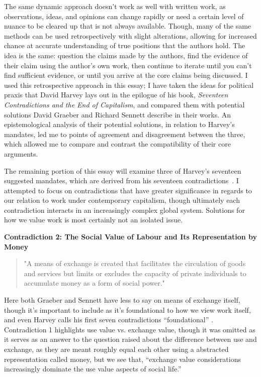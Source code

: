 \documentclass[12pt,a4paper]{article}
\begin{document}
The same dynamic approach doesn’t work as well with written work, as observations, ideas, and opinions can change rapidly or need a certain level of nuance to be cleared up that is not always available. Though, many of the same methods can be used retrospectively with slight alterations, allowing for increased chance at accurate understanding of true positions that the authors hold. The idea is the same: question the claims made by the authors, find the evidence of their claim using the author's own work, then continue to iterate until you can’t find sufficient evidence, or until you arrive at the core claims being discussed. I used this retrospective approach in this essay; I have taken the ideas for political praxis that David Harvey lays out in the epilogue of his book, \textit{Seventeen Contradictions and the End of Capitalism}, and compared them with potential solutions David Graeber and Richard Sennett describe in their works. An epistemological analysis of their potential solutions, in relation to Harvey’s mandates, led me to points of agreement and disagreement between the three, which allowed me to compare and contrast the compatibility of their core arguments. 
\vspace*{10pt}

The remaining portion of this essay will examine three of Harvey's seventeen suggested mandates, which are derived from his seventeen contradictions~\cite{con}. I attempted to focus on contradictions that have greater significance in regards to our relation to work under contemporary capitalism, though ultimately each contradiction interacts in an increasingly complex global system. Solutions for how we value work is most certainly not an isolated issue.

\textbf{Contradiction 2: The Social Value of Labour and Its Representation
by Money}
\begin{quotation} {\color{G-Moon}
    \noindent "A means of exchange is created that facilitates the circulation of goods and services but limits or excludes the capacity of private individuals to accumulate money as a form of social power." \cite{con}}
\end{quotation}
Here both Graeber and Sennett have less to say on means of exchange itself, though it’s important to include as it’s foundational to how we view work itself, and even Harvey calls his first seven contradictions “foundational” \cite{con}. Contradiction 1 highlights use value vs. exchange value, though it was omitted as it serves as an answer to the question raised about the difference between use and exchange, as they are meant roughly equal each other using a abstracted representation called money, but we see that, “exchange value considerations increasingly dominate the use value aspects of social life.” \cite{con}  
\vspace*{10pt}
\end{document}
